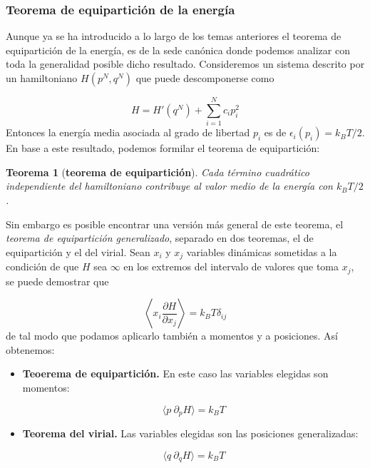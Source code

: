 \documentclass[12pt,a4paper]{article}
\numberwithin{equation}{section}
\numberwithin{figure}{section}
\newcommand{\parciales}[2]{\frac{\partial #1}{\partial #2}}
\newtheorem{theorem}{Teorema}[section]
\theoremstyle{definition}
\begin{document}
\subsubsection{Teorema de equipartición de la energía}

Aunque ya se ha introducido a lo largo de los temas anteriores el teorema de equipartición de la energía, es de la sede canónica donde podemos analizar con toda la generalidad posible dicho resultado. Consideremos un sistema descrito por un hamiltoniano $H(p^N,q^N)$ que puede descomponerse como

\begin{equation}
H = H'(q^N)  + \sum_{i=1}^N c_i p_i^2
\end{equation}
Entonces la energía media asociada al grado de libertad $p_i$ es de $\epsilon_i (p_i)=k_B T/2$. En base a este resultado, podemos formilar el teorema de equipartición:

\begin{theorem}[{\bf teorema de equipartición}]
Cada término cuadrático independiente del hamiltoniano contribuye al valor medio de la energía con $k_BT/2$.
\end{theorem}

Sin embargo es posible encontrar una versión más general de este teorema, el \textit{teorema de equipartición generalizado}, separado en dos teoremas, el de equipartición y el del virial. Sean $x_i$ y $x_j$ variables dinámicas sometidas a la condición de que $H$ sea $\infty$ en los extremos del intervalo de valores que toma $x_j$, se puede demostrar que

\begin{equation}
\left\langle x_i \parciales{H}{x_j} \right\rangle = k_B T \delta_{ij}
\end{equation}
de tal modo que podamos aplicarlo también a momentos y a posiciones. Así obtenemos:

\begin{itemize}
\item \textbf{Teoerema de equipartición.} En este caso las variables elegidas son momentos:

\begin{equation}
\langle p \ \partial_{p} H \rangle = k_B T
\end{equation}
\item \textbf{Teorema del virial.} Las variables elegidas son las posiciones generalizadas:

\begin{equation}
\langle q \ \partial_{q} H  \rangle = k_B T 
\end{equation}
\end{itemize}
\end{document}
